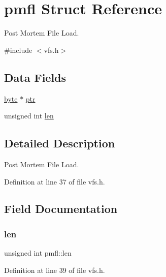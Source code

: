 \hypertarget{a00320}{}\section{pmfl Struct Reference}
\label{a00320}


Post Mortem File Load.  




{\ttfamily \#include $<$vfs.\+h$>$}

\subsection*{Data Fields}
\begin{DoxyCompactItemize}
\item 
\hyperlink{a00140_ab8ef12fab634c171394422d0ee8baf94_ab8ef12fab634c171394422d0ee8baf94}{byte} $\ast$ \hyperlink{a00320_a150c011a31f99dbd408f8650f3fa1089_a150c011a31f99dbd408f8650f3fa1089}{ptr}
\item 
unsigned int \hyperlink{a00320_a151dcc6387f9c9186b4b84526c3a89ff_a151dcc6387f9c9186b4b84526c3a89ff}{len}
\end{DoxyCompactItemize}


\subsection{Detailed Description}
Post Mortem File Load. 

Definition at line 37 of file vfs.\+h.



\subsection{Field Documentation}
\mbox{\label{a00320_a151dcc6387f9c9186b4b84526c3a89ff_a151dcc6387f9c9186b4b84526c3a89ff}} 
\subsubsection{\texorpdfstring{len}{len}}
{\footnotesize\ttfamily unsigned int pmfl\+::len}



Definition at line 39 of file vfs.\+h.

\mbox{\label{a00320_a150c011a31f99dbd408f8650f3fa1089_a150c011a31f99dbd408f8650f3fa1089}} 
